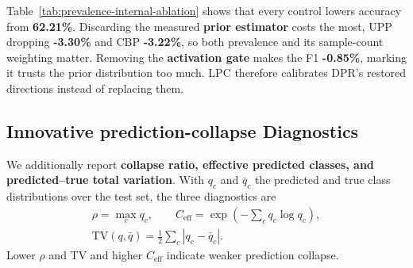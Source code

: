 \documentclass[letterpaper]{article} %
\begin{document}
Table~\ref{tab:prevalence-internal-ablation} shows that every control lowers accuracy from \textbf{62.21\%}. Discarding the measured \textbf{prior estimator} costs the most, UPP dropping \textbf{\textcolor{DropRed}{-3.30\%}} and CBP \textbf{\textcolor{DropRed}{-3.22\%}}, so both prevalence and its sample-count weighting matter. Removing the \textbf{activation gate} makes the F1 \textbf{\textcolor{DropRed}{-0.85\%}}, marking it trusts the prior distribution too much. LPC therefore calibrates DPR's restored directions instead of replacing them.


\subsection{Innovative prediction-collapse Diagnostics}
We additionally report \textbf{collapse ratio, effective predicted classes, and predicted--true total variation}. With $q_c$ and $\bar{q}_c$ the predicted and true class distributions over the test set, the three diagnostics are
\begin{equation}
\begin{array}{c}
\rho=\max_c q_c,\qquad C_{\mathrm{eff}}=\exp\left(-\sum_c q_c\log q_c\right),\\[3pt]
\mathrm{TV}(q,\bar{q})=\frac{1}{2}\sum_c|q_c-\bar{q}_c|.
\end{array}
\end{equation}
Lower $\rho$ and TV and higher $C_{\mathrm{eff}}$ indicate weaker prediction collapse.
\end{document}
